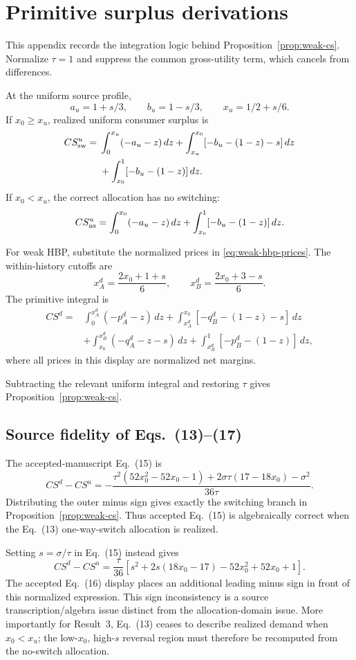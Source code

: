 \section{Primitive surplus derivations}
\label{app:surplus}

This appendix records the integration logic behind Proposition~\ref{prop:weak-cs}. Normalize \(\tau=1\) and suppress the common gross-utility term, which cancels from differences.

At the uniform source profile,
\[
a_u=1+s/3,
\qquad
b_u=1-s/3,
\qquad
x_u=1/2+s/6.
\]
If \(x_0\ge x_u\), realized uniform consumer surplus is
\begin{align*}
CS^u_{\rm sw}
={}&
\int_0^{x_u}(-a_u-z)\,dz
+
\int_{x_u}^{x_0}[-b_u-(1-z)-s]\,dz\\
&+
\int_{x_0}^{1}[-b_u-(1-z)]\,dz.
\end{align*}
If \(x_0<x_u\), the correct allocation has no switching:
\[
CS^u_{\rm ns}
=
\int_0^{x_0}(-a_u-z)\,dz
+
\int_{x_0}^{1}[-b_u-(1-z)]\,dz.
\]

For weak HBP, substitute the normalized prices in \eqref{eq:weak-hbp-prices}. The within-history cutoffs are
\[
x_A^d=\frac{2x_0+1+s}{6},
\qquad
x_B^d=\frac{2x_0+3-s}{6}.
\]
The primitive integral is
\begin{align*}
CS^d
={}&
\int_0^{x_A^d}(-p_A^d-z)\,dz
+
\int_{x_A^d}^{x_0}[-q_B^d-(1-z)-s]\,dz\\
&+
\int_{x_0}^{x_B^d}(-q_A^d-z-s)\,dz
+
\int_{x_B^d}^{1}[-p_B^d-(1-z)]\,dz,
\end{align*}
where all prices in this display are normalized net margins.

Subtracting the relevant uniform integral and restoring \(\tau\) gives Proposition~\ref{prop:weak-cs}.

\subsection{Source fidelity of Eqs.~(13)--(17)}

The accepted-manuscript Eq.~(15) is
\[
CS^d-CS^u
=
-\frac{\tau^2(52x_0^2-52x_0-1)
+2\sigma\tau(17-18x_0)-\sigma^2}{36\tau}.
\]
Distributing the outer minus sign gives exactly the switching branch in Proposition~\ref{prop:weak-cs}. Thus accepted Eq.~(15) is algebraically correct when the Eq.~(13) one-way-switch allocation is realized.

Setting \(s=\sigma/\tau\) in Eq.~(15) instead gives
\[
CS^d-CS^u
=
\frac{\tau}{36}
\left[
s^2+2s(18x_0-17)-52x_0^2+52x_0+1
\right].
\]
The accepted Eq.~(16) display places an additional leading minus sign in front of this normalized expression. This sign inconsistency is a source transcription/algebra issue distinct from the allocation-domain issue. More importantly for Result~3, Eq.~(13) ceases to describe realized demand when \(x_0<x_u\); the low-\(x_0\), high-\(s\) reversal region must therefore be recomputed from the no-switch allocation.

